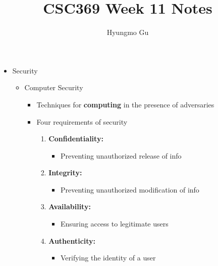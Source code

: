 \documentclass[12pt]{article}
\begin{document}
\title{CSC369 Week 11 Notes}
\author{Hyungmo Gu}
\maketitle

\begin{itemize}
    \item Security
    \begin{itemize}
        \item Computer Security
        \begin{itemize}
            \item Techniques for \textbf{computing} in the presence of adversaries
            \item Four requirements of security
            \begin{enumerate}[1.]
                \item \textbf{Confidentiality:}
                \begin{itemize}
                    \item Preventing unauthorized release of info
                \end{itemize}
                \item \textbf{Integrity:}
                \begin{itemize}
                    \item Preventing unauthorized modification of info
                \end{itemize}
                \item \textbf{Availability:}
                \begin{itemize}
                    \item Ensuring access to legitimate users
                \end{itemize}
                \item \textbf{Authenticity:}
                \begin{itemize}
                    \item Verifying the identity of a user
                \end{itemize}
            \end{enumerate}


\end{itemize}
\end{itemize}
\end{itemize}
\end{document}
